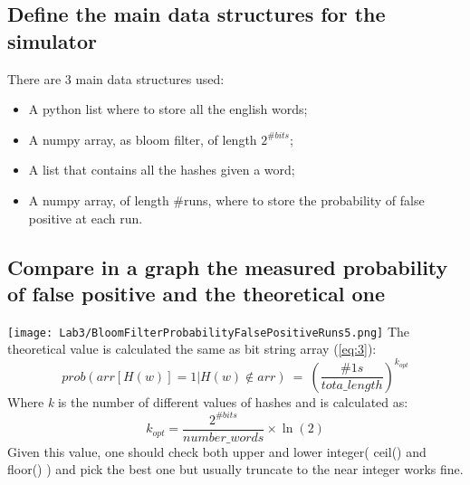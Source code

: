 \documentclass{report}
\begin{document}
			\subsection{Define the main data structures for the simulator}
						There are 3 main data structures used: 
							\begin{itemize}
								\item A python list where to store all the english words;
								\item A numpy array, as bloom filter, of length $2^{\#bits}$;
								\item A list that contains all the hashes given a word;
								\item A numpy array, of length \#runs, where to store the probability of false positive at each run.
							\end{itemize}
					
			\subsection{Compare in a graph the measured probability of false positive and the theoretical one}
			\texttt{[image: Lab3/BloomFilterProbabilityFalsePositiveRuns5.png]}
			The theoretical value is calculated the same as bit string array (\ref{eq:3}):
			\begin{equation}\label{eq:5}
				prob(arr[H(w)]=1|H(w) \not\in arr) \: = \: \left( \frac{\#1s}{tota\_length} \right)^{k_{opt}}
			\end{equation}
			Where \emph{k} is the number of different values of hashes and is calculated as: 
			\[
					k_{opt} = \frac {2^{\#bits}}{number\_words} \times \ln(2)
			\]
			Given this value, one should check both upper and lower integer( ceil() and floor() ) and pick the best one but usually truncate to the near integer works fine.
			
			
			\newpage 
			
\end{document}
